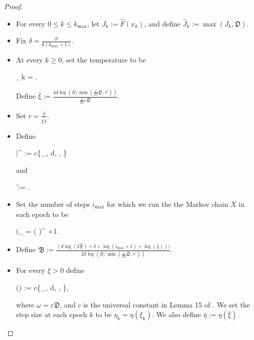 \documentclass[final,12pt]{colt2018} %
\def \be{\begin{equs}}
\def \ee{\end{equs}}
\begin{document}
{\begin{proof}
\begin{itemize}
\item For every $0\leq k \leq k_{\mathrm{max}}$, let $J_k := \hat{F}(x_k)$, and define $\hat{J}_k := \max(J_k, \mathfrak{D})$.


\item Fix $\delta = \frac{\delta'}{6( k_{\mathrm{max}}+1)}$.


\item At every $k \geq 0$, set the temperature to be
\be \label{eq:xi_k}
\xi_k =  .
\ee
  Define $\bar{\xi} := \frac{4 d \log(R/\min(\frac{\varepsilon}{2\lambda}  \mathfrak{D}, r'))}{\frac{1}{25}\varepsilon  \mathfrak{D}}$.  


\item Set $r = \frac{\delta}{\bar{\xi}\tilde{\lambda}}$.


\item Define
\be
\bar{\eta}^{\dagger} := c\min \left\{\zeta_{}, d, , \right\}
\ee
and
\be
{}':= .
\ee

 \item Set the number of steps $i_{\mathrm{max}}$ for which we run the the Markov chain $X$ in each epoch to be
 \be \label{eq:i_max}
 \hspace{-12mm} i_ = \left \lceil \left (  \right )^{} \right \rceil +1.
 \ee
%
\item Define $\mathfrak{B}:= \frac{\left(d\log(2\frac{R}{r}) +\delta +  \log(i_{\max}+1) + \log(\frac{1}{\delta})\right))}{2 d \log(R/\min(\frac{\varepsilon}{2\lambda} \mathfrak{D}, r'))}$.

\item For every $\xi >0$ define
\be \label{eq:eta_k}
\hspace{-2mm} \eta(\xi) := c\min \left\{\zeta_{}, d, , \right\},
\ee
\noindent where $\omega = \varepsilon \mathfrak{D}$, and $c$ is the universal constant in Lemma 15 of \cite{hitting_times}.
\noindent We set the step size at each epoch $k$ to be $\eta_k = \eta(\xi_k)$.  We also define $\bar{\eta} := \eta(\bar{\xi})$.


\end{itemize}
\end{proof}}
\end{document}
